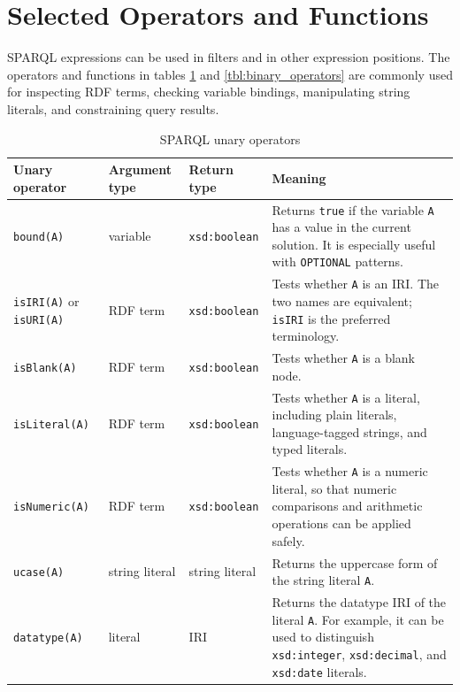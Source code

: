 \documentclass{scrbook}
\begin{document}
	\section{Selected Operators and Functions}
	
	SPARQL expressions can be used in filters and in other expression positions. The operators and functions in tables \ref{tbl:unary_operators} and \ref{tbl:binary_operators} are commonly used for inspecting RDF terms, checking variable bindings, manipulating string literals, and constraining query results.\\
	
	\begin{table}
		\begin{tabularx}{\linewidth}{|X|p{5em}|p{7em}|X|}\hline
			\textbf{Unary operator} & \textbf{Argument type} & \textbf{Return type} & \textbf{Meaning} \\
			\hline
			
			\texttt{bound(A)} & variable & \texttt{xsd:boolean} & Returns \texttt{true} if the variable \texttt{A} has a value in the current solution. It is especially useful with \texttt{OPTIONAL} patterns. \\ \hline
			
			\texttt{isIRI(A)} or \texttt{isURI(A)} & RDF term & \texttt{xsd:boolean} & Tests whether \texttt{A} is an IRI. The two names are equivalent; \texttt{isIRI} is the preferred terminology. \\ \hline
			
			\texttt{isBlank(A)} & RDF term & \texttt{xsd:boolean} & Tests whether \texttt{A} is a blank node. \\ \hline
			
			\texttt{isLiteral(A)} & RDF term & \texttt{xsd:boolean} & Tests whether \texttt{A} is a literal, including plain literals, language-tagged strings, and typed literals. \\ \hline
			
			\texttt{isNumeric(A)} & RDF term & \texttt{xsd:boolean} & Tests whether \texttt{A} is a numeric literal, so that numeric comparisons and arithmetic operations can be applied safely. \\ \hline
			
			\texttt{ucase(A)} & string literal & string literal & Returns the uppercase form of the string literal \texttt{A}. \\ \hline
			
			\texttt{datatype(A)} & literal & IRI & Returns the datatype IRI of the literal \texttt{A}. For example, it can be used to distinguish \texttt{xsd:integer}, \texttt{xsd:decimal}, and \texttt{xsd:date} literals. \\ \hline
		\end{tabularx}
		\caption{SPARQL unary operators}
		\label{tbl:unary_operators}
	\end{table}
	
\end{document}
